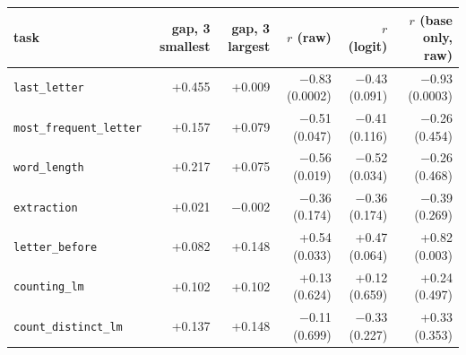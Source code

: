 \begin{tabular}{@{}lrrrrr@{}}
\toprule
task & gap, 3 smallest & gap, 3 largest & $r$ (raw) & $r$ (logit) & $r$ (base only, raw) \\
\midrule
\texttt{last\_letter} & +0.455 & +0.009 & $-$0.83 (0.0002) & $-$0.43 (0.091) & $-$0.93 (0.0003) \\
\texttt{most\_frequent\_letter} & +0.157 & +0.079 & $-$0.51 (0.047) & $-$0.41 (0.116) & $-$0.26 (0.454) \\
\texttt{word\_length} & +0.217 & +0.075 & $-$0.56 (0.019) & $-$0.52 (0.034) & $-$0.26 (0.468) \\
\texttt{extraction} & +0.021 & $-$0.002 & $-$0.36 (0.174) & $-$0.36 (0.174) & $-$0.39 (0.269) \\
\texttt{letter\_before} & +0.082 & +0.148 & +0.54 (0.033) & +0.47 (0.064) & +0.82 (0.003) \\
\texttt{counting\_lm} & +0.102 & +0.102 & +0.13 (0.624) & +0.12 (0.659) & +0.24 (0.497) \\
\texttt{count\_distinct\_lm} & +0.137 & +0.148 & $-$0.11 (0.699) & $-$0.33 (0.227) & +0.33 (0.353) \\
\bottomrule
\end{tabular}